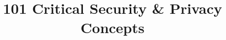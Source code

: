\documentclass{soups}
\begin{document}

\title{101 Critical Security \& Privacy Concepts}


\maketitle










\nocite{*}
\end{document}
